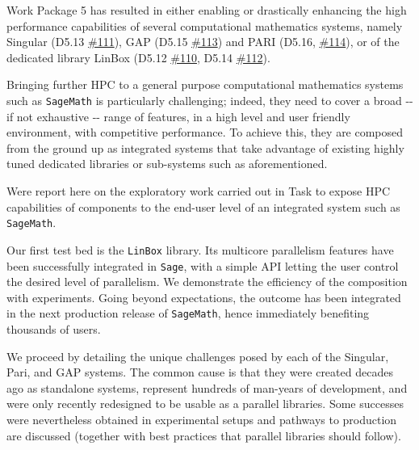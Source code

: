 Work Package 5 has resulted in either enabling or drastically enhancing
the high performance capabilities of several computational mathematics
systems, namely Singular (D5.13
\href{https://github.com/OpenDreamKit/OpenDreamKit/issues/111}{\#111}),
GAP (D5.15
\href{https://github.com/OpenDreamKit/OpenDreamKit/issues/113}{\#113})
and PARI (D5.16,
\href{https://github.com/OpenDreamKit/OpenDreamKit/issues/114}{\#114}),
or of the dedicated library LinBox (D5.12
\href{https://github.com/OpenDreamKit/OpenDreamKit/issues/110}{\#110},
D5.14
\href{https://github.com/OpenDreamKit/OpenDreamKit/issues/112}{\#112}).

Bringing further HPC to a general purpose computational mathematics
systems such as \texttt{SageMath} is particularly challenging; indeed,
they need to cover a broad -\/- if not exhaustive -\/- range of
features, in a high level and user friendly environment, with
competitive performance. To achieve this, they are composed from the
ground up as integrated systems that take advantage of existing highly
tuned dedicated libraries or sub-systems such as aforementioned.

Were report here on the exploratory work carried out in Task to expose
HPC capabilities of components to the end-user level of an integrated
system such as \texttt{SageMath}.

Our first test bed is the \texttt{LinBox} library. Its multicore
parallelism features have been successfully integrated in \texttt{Sage},
with a simple API letting the user control the desired level of
parallelism. We demonstrate the efficiency of the composition with
experiments. Going beyond expectations, the outcome has been integrated
in the next production release of \texttt{SageMath}, hence immediately
benefiting thousands of users.

We proceed by detailing the unique challenges posed by each of the
Singular, Pari, and GAP systems. The common cause is that they were
created decades ago as standalone systems, represent hundreds of
man-years of development, and were only recently redesigned to be usable
as a parallel libraries. Some successes were nevertheless obtained in
experimental setups and pathways to production are discussed (together
with best practices that parallel libraries should follow).

